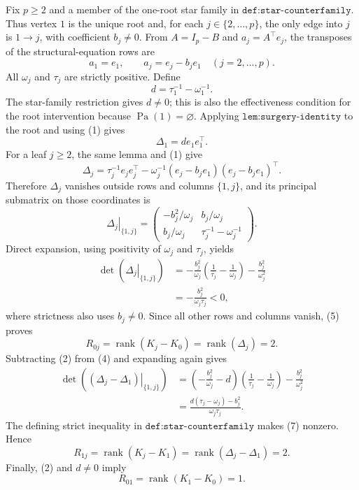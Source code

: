 Fix \(p\geq 2\) and a member of the one-root star family in \(\texttt{def:star-counterfamily}\).  Thus vertex \(1\) is the unique root and, for each \(j\in\{2,\ldots,p\}\), the only edge into \(j\) is \(1\to j\), with coefficient \(b_j\neq0\).  From \(A=I_p-B\) and \(a_j=A^{\top}e_j\), the transposes of the structural-equation rows are
\[
 a_1=e_1,
 \qquad
 a_j=e_j-b_je_1\quad (j=2,\ldots,p).
 \tag{1}
\]
All \(\omega_j\) and \(\tau_j\) are strictly positive.  Define
\[
 d=\tau_1^{-1}-\omega_1^{-1}.
\]
The star-family restriction gives \(d\neq0\); this is also the effectiveness condition for the root intervention because \(\operatorname{Pa}(1)=\varnothing\).  Applying \(\texttt{lem:surgery-identity}\) to the root and using (1) gives
\[
 \Delta_1=d e_1e_1^{\top}.
 \tag{2}
\]
For a leaf \(j\geq2\), the same lemma and (1) give
\[
 \Delta_j
 =\tau_j^{-1}e_je_j^{\top}
  -\omega_j^{-1}(e_j-b_je_1)(e_j-b_je_1)^{\top}.
 \tag{3}
\]
Therefore \(\Delta_j\) vanishes outside rows and columns \(\{1,j\}\), and its principal submatrix on those coordinates is
\[
 \left.\Delta_j\right|_{\{1,j\}}
 =
 \begin{pmatrix}
 -b_j^2/\omega_j & b_j/\omega_j\\
 b_j/\omega_j & \tau_j^{-1}-\omega_j^{-1}
 \end{pmatrix}.
 \tag{4}
\]
Direct expansion, using positivity of \(\omega_j\) and \(\tau_j\), yields
\[
 \begin{aligned}
 \det\!\left(\left.\Delta_j\right|_{\{1,j\}}\right)
 &= -\frac{b_j^2}{\omega_j}
       \left(\frac1{\tau_j}-\frac1{\omega_j}\right)
    -\frac{b_j^2}{\omega_j^2}\\
 &= -\frac{b_j^2}{\omega_j\tau_j}<0,
 \end{aligned}
 \tag{5}
\]
where strictness also uses \(b_j\neq0\).  Since all other rows and columns vanish, (5) proves
\[
 R_{0j}=\operatorname{rank}(K_j-K_0)
 =\operatorname{rank}(\Delta_j)=2.
 \tag{6}
\]
Subtracting (2) from (4) and expanding again gives
\[
 \begin{aligned}
 \det\!\left(
   \left.(\Delta_j-\Delta_1)\right|_{\{1,j\}}
 \right)
 &=\left(-\frac{b_j^2}{\omega_j}-d\right)
      \left(\frac1{\tau_j}-\frac1{\omega_j}\right)
      -\frac{b_j^2}{\omega_j^2}\\
 &=\frac{d(\tau_j-\omega_j)-b_j^2}{\omega_j\tau_j}.
 \end{aligned}
 \tag{7}
\]
The defining strict inequality in \(\texttt{def:star-counterfamily}\) makes (7) nonzero.  Hence
\[
 R_{1j}=\operatorname{rank}(K_j-K_1)
 =\operatorname{rank}(\Delta_j-\Delta_1)=2.
 \tag{8}
\]
Finally, (2) and \(d\neq0\) imply
\[
 R_{01}=\operatorname{rank}(K_1-K_0)=1.
 \tag{9}
\]

